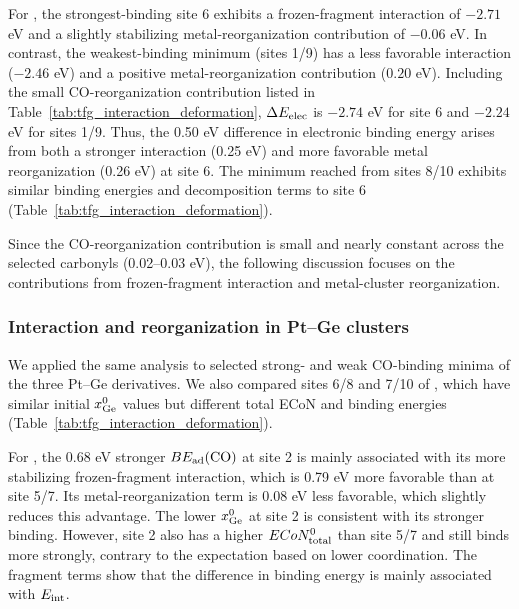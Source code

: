 For , the strongest-binding site 6 exhibits a frozen-fragment interaction of $-2.71$ eV and a slightly stabilizing metal-reorganization contribution of $-0.06$ eV. In contrast, the weakest-binding minimum (sites 1/9) has a less favorable interaction ($-2.46$ eV) and a positive metal-reorganization contribution ($0.20$ eV). {Including the small CO-reorganization contribution listed in Table~\ref{tab:tfg_interaction_deformation}, $\Delta E_{\rm elec}$ is $-2.74$ eV for site 6 and $-2.24$ eV for sites 1/9.} Thus, the 0.50 eV difference in electronic binding energy arises from both a stronger interaction (0.25 eV) and more favorable metal reorganization (0.26 eV) at site 6. The minimum reached from sites 8/10 exhibits similar binding energies and decomposition terms to site 6 (Table~\ref{tab:tfg_interaction_deformation}).

Since the CO-reorganization contribution is small and nearly constant across the
selected carbonyls (0.02–0.03 eV), the following discussion focuses on the 
contributions
from frozen-fragment interaction and metal-cluster reorganization.

\subsubsection{Interaction and reorganization in Pt--Ge clusters}
\label{subsec:ptge_interaction_reorganization}

{We applied the same analysis to
selected strong- and weak CO-binding minima of the three Pt--Ge derivatives. We
also compared sites 6/8 and 7/10 of , which have similar
initial $x_{\rm Ge}^{0}$ values but different total ECoN and binding energies
(Table~\ref{tab:tfg_interaction_deformation}).}

For , the 0.68 eV stronger $BE_{\rm ad}(\ce{CO})$ at site 2 is mainly associated with its more stabilizing frozen-fragment interaction, which is 0.79 eV more favorable than at site 5/7. Its metal-reorganization term is 0.08 eV less favorable, which slightly reduces this advantage. The lower $x_{\rm Ge}^{0}$ at site 2 is consistent with its stronger binding. However, site 2 also has a higher $ECoN_{\rm total}^{0}$ than site 5/7 and still binds  more strongly, contrary to the expectation based on lower coordination. The fragment terms show that the difference in binding energy is mainly associated with $E_{\rm int}$.

